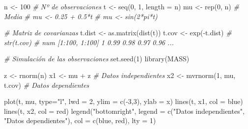 \documentclass[
]{book}
\newenvironment{Shaded}{\begin{snugshade}}{\end{snugshade}}
\newcommand{\AttributeTok}[1]{\textcolor[rgb]{0.77,0.63,0.00}{#1}}
\newcommand{\CommentTok}[1]{\textcolor[rgb]{0.56,0.35,0.01}{\textit{#1}}}
\newcommand{\DecValTok}[1]{\textcolor[rgb]{0.00,0.00,0.81}{#1}}
\newcommand{\FunctionTok}[1]{\textcolor[rgb]{0.00,0.00,0.00}{#1}}
\newcommand{\NormalTok}[1]{#1}
\newcommand{\OtherTok}[1]{\textcolor[rgb]{0.56,0.35,0.01}{#1}}
\newcommand{\SpecialCharTok}[1]{\textcolor[rgb]{0.00,0.00,0.00}{#1}}
\newcommand{\StringTok}[1]{\textcolor[rgb]{0.31,0.60,0.02}{#1}}
\theoremstyle{break}
\theoremstyle{nonumberplain}
\begin{document}
\begin{Shaded}
\begin{Highlighting}[]
\NormalTok{n }\OtherTok{\textless{}{-}} \DecValTok{100}          \CommentTok{\# Nº de observaciones}
\NormalTok{t }\OtherTok{\textless{}{-}} \FunctionTok{seq}\NormalTok{(}\DecValTok{0}\NormalTok{, }\DecValTok{1}\NormalTok{, }\AttributeTok{length =}\NormalTok{ n)}
\NormalTok{mu }\OtherTok{\textless{}{-}} \FunctionTok{rep}\NormalTok{(}\DecValTok{0}\NormalTok{, n)   }\CommentTok{\# Media}
\CommentTok{\# mu \textless{}{-} 0.25 + 0.5*t}
\CommentTok{\# mu \textless{}{-} sin(2*pi*t)}

\CommentTok{\# Matriz de covarianzas}
\NormalTok{t.dist }\OtherTok{\textless{}{-}} \FunctionTok{as.matrix}\NormalTok{(}\FunctionTok{dist}\NormalTok{(t))}
\NormalTok{t.cov }\OtherTok{\textless{}{-}} \FunctionTok{exp}\NormalTok{(}\SpecialCharTok{{-}}\NormalTok{t.dist)}
\CommentTok{\# str(t.cov)}
\CommentTok{\# num [1:100, 1:100] 1 0.99 0.98 0.97 0.96 ...}

\CommentTok{\# Simulación de las observaciones}
\FunctionTok{set.seed}\NormalTok{(}\DecValTok{1}\NormalTok{)}
\FunctionTok{library}\NormalTok{(MASS)}

\NormalTok{z }\OtherTok{\textless{}{-}} \FunctionTok{rnorm}\NormalTok{(n)}
\NormalTok{x1 }\OtherTok{\textless{}{-}}\NormalTok{ mu }\SpecialCharTok{+}\NormalTok{ z }\CommentTok{\# Datos independientes}
\NormalTok{x2 }\OtherTok{\textless{}{-}} \FunctionTok{mvrnorm}\NormalTok{(}\DecValTok{1}\NormalTok{, mu, t.cov) }\CommentTok{\# Datos dependientes}

\FunctionTok{plot}\NormalTok{(t, mu, }\AttributeTok{type=}\StringTok{"l"}\NormalTok{, }\AttributeTok{lwd =} \DecValTok{2}\NormalTok{, }\AttributeTok{ylim =} \FunctionTok{c}\NormalTok{(}\SpecialCharTok{{-}}\DecValTok{3}\NormalTok{,}\DecValTok{3}\NormalTok{), }\AttributeTok{ylab =} \StringTok{\textquotesingle{}x\textquotesingle{}}\NormalTok{)}
\FunctionTok{lines}\NormalTok{(t, x1, }\AttributeTok{col =} \StringTok{\textquotesingle{}blue\textquotesingle{}}\NormalTok{)}
\FunctionTok{lines}\NormalTok{(t, x2, }\AttributeTok{col =} \StringTok{\textquotesingle{}red\textquotesingle{}}\NormalTok{)}
\FunctionTok{legend}\NormalTok{(}\StringTok{"bottomright"}\NormalTok{, }\AttributeTok{legend =} \FunctionTok{c}\NormalTok{(}\StringTok{"Datos independientes"}\NormalTok{, }\StringTok{"Datos dependientes"}\NormalTok{), }\AttributeTok{col =} \FunctionTok{c}\NormalTok{(}\StringTok{\textquotesingle{}blue\textquotesingle{}}\NormalTok{, }\StringTok{\textquotesingle{}red\textquotesingle{}}\NormalTok{), }\AttributeTok{lty =} \DecValTok{1}\NormalTok{)}
\end{Highlighting}
\end{Shaded}
\end{document}

